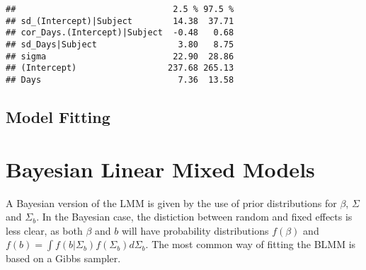 \documentclass[]{article}
\begin{document}
\begin{verbatim}
##                               2.5 % 97.5 %
## sd_(Intercept)|Subject        14.38  37.71
## cor_Days.(Intercept)|Subject  -0.48   0.68
## sd_Days|Subject                3.80   8.75
## sigma                         22.90  28.86
## (Intercept)                  237.68 265.13
## Days                           7.36  13.58
\end{verbatim}

\hypertarget{model-fitting}{%
\subsection{Model Fitting}\label{model-fitting}}

\hypertarget{bayesian-linear-mixed-models}{%
\section{Bayesian Linear Mixed
Models}\label{bayesian-linear-mixed-models}}

A Bayesian version of the LMM is given by the use of prior distributions
for \(\beta\), \(\Sigma\) and \(\Sigma_b\). In the Bayesian case, the
distiction between random and fixed effects is less clear, as both
\(\beta\) and \(b\) will have probability distributions \(f(\beta)\) and
\(f(b) = \int f(b | \Sigma_b) f(\Sigma_b)d\Sigma_b\). The most common
way of fitting the BLMM is based on a Gibbs sampler.
\end{document}
